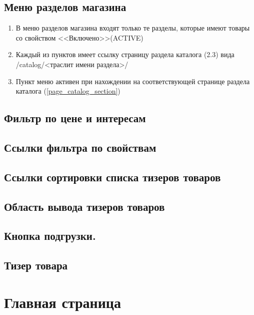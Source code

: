         \subsection{Меню разделов магазина}
            \begin{enumerate}
                \item В меню разделов магазина входят только те разделы, которые имеют товары со свойством <<Включено>>(ACTIVE)
                \item Каждый из пунктов имеет ссылку страницу раздела каталога (2.3) вида /catalog/<траслит имени раздела>/
                \item Пункт меню активен при нахождении на соответствующей странице раздела каталога (\ref{page_catalog_section})
            \end{enumerate}
        \subsection{Фильтр по цене и интересам}
            \label{sec:baseitems_interest_filter}
        \subsection{Ссылки фильтра по свойствам}
            \label{sec:baseitems_props_filter}
        \subsection{Ссылки сортировки списка тизеров товаров}
            \label{sec:baseitems_goods_sort}
        \subsection{Область вывода тизеров товаров}
            \label{sec:baseitems_goods_area}
        \subsection{Кнопка подгрузки.}
            \label{sec:baseitems_goods_more}
        \subsection{Тизер товара}




    \section{Главная страница}

